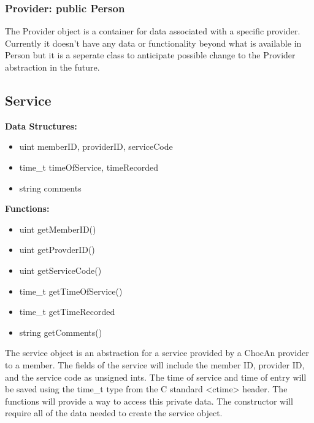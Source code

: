 \documentclass{article}
\begin{document}
\subsubsection{Provider: public Person}
The Provider object is a container for data associated with a specific provider. Currently it doesn’t have any data or functionality beyond what is available in Person but it is a seperate class to anticipate possible change to the Provider abstraction in the future.

\subsection{Service}
\textbf{Data Structures:}
\begin{itemize}
   \item uint memberID, providerID, serviceCode
   \item time_t timeOfService, timeRecorded
   \item string comments
\end{itemize}
\textbf{Functions:}
\begin{itemize}
   \item uint getMemberID()
   \item uint getProvderID()
   \item uint getServiceCode()
   \item time_t getTimeOfService()
   \item time_t getTimeRecorded
   \item string getComments()
\end{itemize}
The service object is an abstraction for a service provided by a ChocAn provider to a member. The fields of the service will include the member ID, provider ID, and the service code as unsigned ints. The time of service and time of entry will be saved using the time_t type from the C standard <ctime> header. The functions will provide a way to access this private data. The constructor will require all of the data needed to create the service object.
\end{document}
